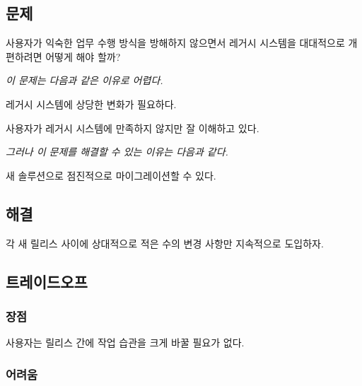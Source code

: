 \documentclass[a4paper,10pt,twoside]{book}
\begin{document}


\subsection*{문제}

사용자가 익숙한 업무 수행 방식을 방해하지 않으면서 레거시 시스템을 대대적으로 개편하려면 어떻게 해야 할까?

\emph{이 문제는 다음과 같은 이유로 어렵다.}

\begin{bulletlist}
\item 레거시 시스템에 상당한 변화가 필요하다.

\item 사용자가 레거시 시스템에 만족하지 않지만 잘 이해하고 있다.
\end{bulletlist}

\emph{그러나 이 문제를 해결할 수 있는 이유는 다음과 같다.}

\begin{bulletlist}
\item 새 솔루션으로 점진적으로 마이그레이션할 수 있다.
\end{bulletlist}

\subsection*{해결}

각 새 릴리스 사이에 상대적으로 적은 수의 변경 사항만 지속적으로 도입하자.

\subsection*{트레이드오프}

\subsubsection*{장점}

\begin{bulletlist}
\item 사용자는 릴리스 간에 작업 습관을 크게 바꿀 필요가 없다.
\end{bulletlist}

\subsubsection*{어려움}
\end{document}

